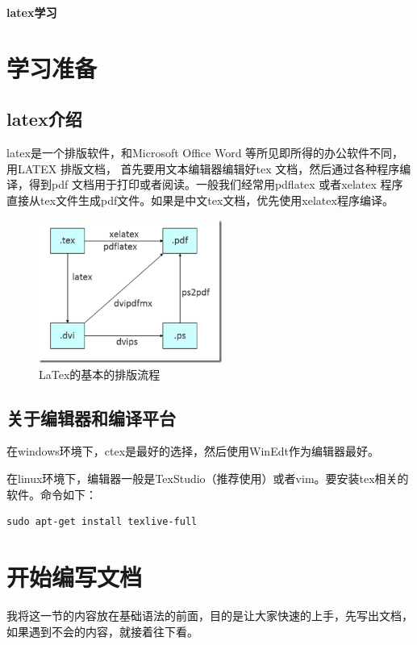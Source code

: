 \documentclass[a4paper,12pt]{ctexbook}
\begin{document}
	
\begin{center}
\huge \textbf{latex学习}
\end{center}

\tableofcontents

\begin{flushleft}

\chapter{学习准备}
\section{latex介绍}
latex是一个排版软件，和Microsoft Office Word 等所见即所得的办公软件不同，用LATEX 排版文档，
首先要用文本编辑器编辑好tex 文档，然后通过各种程序编译，得到pdf 文档用于打印或者阅读。一般我们经常用pdflatex
或者xelatex 程序直接从tex文件生成pdf文件。如果是中文tex文档，优先使用xelatex程序编译。

\begin{figure}[H]
\centering
\includegraphics[width=6cm]{Figures/latex_build.png}
\caption{LaTex的基本的排版流程}	
\end{figure}

\section{关于编辑器和编译平台}
在windows环境下，ctex是最好的选择，然后使用WinEdt作为编辑器最好。

在linux环境下，编辑器一般是TexStudio（推荐使用）或者vim。要安装tex相关的软件。命令如下：
\begin{verbatim}
sudo apt-get install texlive-full
\end{verbatim}


\chapter{开始编写文档}
我将这一节的内容放在基础语法的前面，目的是让大家快速的上手，先写出文档，如果遇到不会的内容，就接着往下看。

\end{flushleft}
\end{document}
